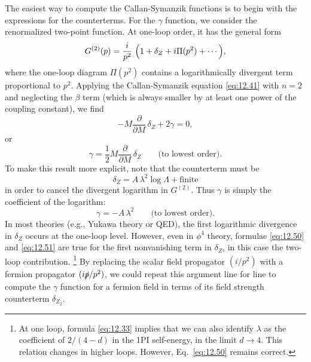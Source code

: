 The easiest way to compute the Callan-Symanzik functions is to begin with the
expressions for the counterterms.  For the $\gamma$ function, we consider the
renormalized two-point function.  At one-loop order, it has the general form
\begin{equation}
  G^{(2)}(p) = \frac{i}{p^2}\ \Bigl( 1 + \delta_Z + i\Pi(p^2) + \cdots
    \Bigr),
  \label{eq:12.49}
\end{equation}
where the one-loop diagram $\Pi(p^2)$ contains a logarithmically divergent
term proportional to $p^2$.  Applying the Callan-Symanzik equation
\eqref{eq:12.41} with $n = 2$ and neglecting the $\beta$ term (which is
always smaller by at least one power of the coupling constant), we find
\begin{equation}
  -M\frac{\partial}{\partial M}\,\delta_Z + 2\gamma = 0,
\end{equation}
or
\begin{equation}
  \gamma = \frac{1}{2}M\frac{\partial}{\partial M}\,\delta_Z
    \qquad \text{(to lowest order)} .
  \label{eq:12.50}
\end{equation}
To make this result more explicit, note that the counterterm must be
\begin{equation}
  \delta_Z = A\,\lambda^2\log\Lambda + \text{finite}
\end{equation}
in order to cancel the divergent logarithm in $G^{(2)}$.  Thus $\gamma$ is
simply the coefficient of the logarithm:
\begin{equation}
  \gamma = -A\,\lambda^2 \qquad \text{(to lowest order)} .
  \label{eq:12.51}
\end{equation}
In most theories (e.g., Yukawa theory or QED), the first logarithmic
divergence in $\delta_Z$ occurs at the one-loop level.  However, even in
$\phi^4$ theory, formulae \eqref{eq:12.50} and \eqref{eq:12.51} are true for
the first nonvanishing term in $\delta_Z$, in this case the two-loop
contribution.%
\footnote{At one loop, formula \eqref{eq:12.33} implies that we can also
identify $\lambda$ as the coefficient of $2/(4-d)$ in the 1PI self-energy, in
the limit $d\to 4$.  This relation changes in higher loops.  However,
Eq.~\eqref{eq:12.50} remains correct.}  By replacing the scalar field
propagator $(i/p^2)$ with a fermion propagator $(i\slashed{p}/p^2)$, we could
repeat this argument line for line to compute the $\gamma$ function for a
fermion field in terms of its field strength counterterm $\delta_{Z_2}$.

